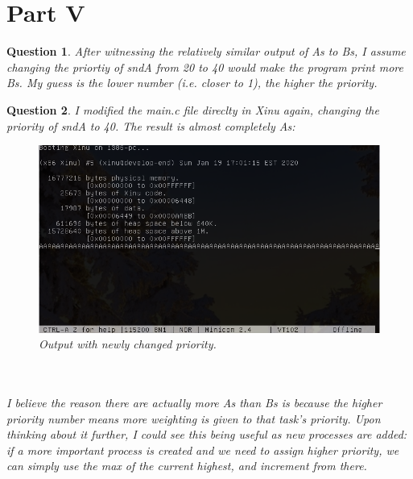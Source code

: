 \documentclass{article}
\newtheorem{theorem}{Question}
\begin{document}
\section{Part V}
\begin{theorem}
After witnessing the relatively similar output of As to Bs, I assume changing the priortiy of sndA from 20 to 40 would
make the program print more Bs. My guess is the lower number (i.e. closer to 1), the higher the priority.
\end{theorem}

\begin{theorem}
I modified the main.c file direclty in Xinu again, changing the priority of sndA to 40. The result is almost completely As:
\begin{figure}[ht!]
  \includegraphics[width=\textwidth]{mainout2.png}
  \caption{Output with newly changed priority.}
\end{figure}\\\\
I believe the reason there are actually more As than Bs is because the higher priority number means more weighting is given
to that task's priority. Upon thinking about it further, I could see this being useful as new processes are added: if a more
important process is created and we need to assign higher priority, we can simply use the max of the current highest, and 
increment from there.
\end{theorem}
\end{document}
